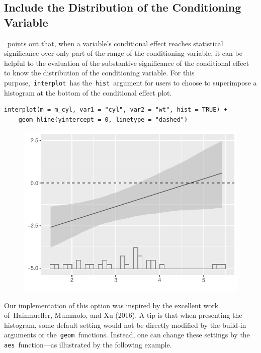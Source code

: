 \documentclass[
  article]{jss}
\begin{document}
\hypertarget{include-the-distribution-of-the-conditioning-variable}{%
\subsection{Include the Distribution of the Conditioning
Variable}\label{include-the-distribution-of-the-conditioning-variable}}

\citep{BerryGolderMilton2012}~points out that, when a variable's
conditional effect reaches statistical significance over only part of
the range of the conditioning variable, it can be helpful to the
evaluation of the substantive significance of the conditional effect to
know the distribution of the conditioning variable. For this
purpose,~\texttt{interplot}~has the~\texttt{hist}~argument for users to
choose to superimpose a histogram at the bottom of the conditional
effect plot.

\begin{verbatim}
interplot(m = m_cyl, var1 = "cyl", var2 = "wt", hist = TRUE) +
    geom_hline(yintercept = 0, linetype = "dashed")
\end{verbatim}

\begin{figure}[H]

{\centering \includegraphics{jss_manuscript_files/figure-pdf/unnamed-chunk-12-1.pdf}

}

\end{figure}

Our implementation of this option was inspired by the excellent work
of~Hainmueller, Mummolo, and Xu (2016). A tip is that when presenting
the histogram, some default setting would not be directly modified by
the build-in arguments or the~\texttt{geom}~functions. Instead, one can
change these settings by the \texttt{aes}~function---as illustrated by
the following example.
\end{document}
